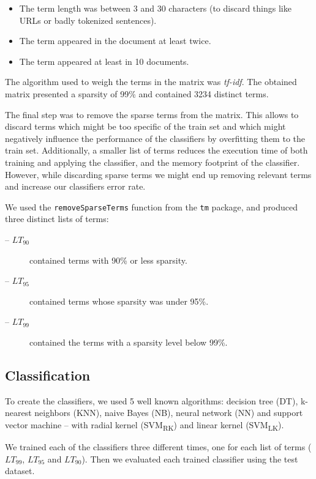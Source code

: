 \documentclass[runningheads,a4paper]{llncs}[2015/06/24]
\begin{document}
\begin{itemize}
    \item The term length was between 3 and 30 characters (to discard
        things like URLs or badly tokenized sentences).
    \item The term appeared in the document at least twice.
    \item The term appeared at least in 10 documents.
\end{itemize}
The algorithm used to weigh the terms in the matrix was
\textit{tf-idf}\cite{christopher2008introduction}. The obtained matrix
presented a sparsity of 99\% and contained 3234 distinct terms.

The final step was to remove the sparse terms from the matrix.
This allows to discard terms which might be too specific of the train
set and which might negatively influence the performance of the
classifiers by overfitting them to the train set. Additionally, a
smaller list of terms reduces the execution time of both training and
applying the classifier, and the memory footprint of the classifier.
However, while discarding sparse terms we might end up removing
relevant terms and increase our classifiers error rate.

We used the \texttt{removeSparseTerms} function from the \texttt{tm}
package, and produced three distinct lists of terms:
\begin{description}
    \item[-- $LT_{90}$] contained terms with 90\% or less sparsity.
    \item[-- $LT_{95}$] contained terms whose sparsity was under 95\%.
    \item[-- $LT_{99}$] contained the terms with a sparsity level
        below 99\%.
\end{description}

\subsection{Classification}

To create the classifiers, we used 5 well known algorithms: decision
tree (DT), k-nearest neighbors (KNN), naive Bayes (NB), neural network
(NN) and support vector
machine -- with radial kernel (SVM\textsubscript{RK}) and linear
kernel (SVM\textsubscript{LK}).

We trained each of the classifiers three different times, one for each
list of terms ($LT_{99}$, $LT_{95}$ and $LT_{90}$). Then we evaluated
each trained classifier using the test dataset.
\end{document}
